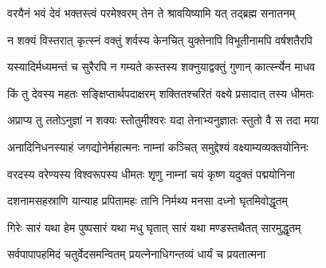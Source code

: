 \twolineshloka
{वरयैनं भवं देवं भक्तस्त्वं परमेश्वरम्}%
{तेन ते श्रावयिष्यामि यत् तद्‌ब्रह्म सनातनम्}%

\twolineshloka
{न शक्यं विस्तरात् कृत्स्नं वक्तुं शर्वस्य केनचित्}%
{युक्तेनापि विभूतीनामपि वर्षशतैरपि}%

\twolineshloka
{यस्यादिर्मध्यमन्तं च सुरैरपि न गम्यते}%
{कस्तस्य शक्नुयाद्वक्तुं गुणान् कार्त्स्न्येन माधव}%

\twolineshloka
{किं तु देवस्य महतः सङ्क्षिप्तार्थपदाक्षरम्}%
{शक्तितश्चरितं वक्ष्ये प्रसादात् तस्य धीमतः}%

\twolineshloka
{अप्राप्य तु ततोऽनुज्ञां न शक्यः स्तोतुमीश्वरः}%
{यदा तेनाभ्यनुज्ञातः स्तुतो वै स तदा मया}%

\twolineshloka
{अनादिनिधनस्याहं जगद्योनेर्महात्मनः}%
{नाम्नां कञ्चित् समुद्देश्यं वक्ष्याम्यव्यक्तयोनिनः}%

\twolineshloka
{वरदस्य वरेण्यस्य विश्वरूपस्य धीमतः}%
{शृणु नाम्नां चयं कृष्ण यदुक्तं पद्मयोनिना}%

\twolineshloka
{दशनामसहस्राणि यान्याह प्रपितामहः}%
{तानि निर्मथ्य मनसा दध्नो घृतमिवोद्धृतम्}%

\twolineshloka
{गिरेः सारं यथा हेम पुष्पसारं यथा मधु}%
{घृतात् सारं यथा मण्डस्तथैतत् सारमुद्धृतम्}%

\twolineshloka
{सर्वपापापहमिदं चतुर्वेदसमन्वितम्}%
{प्रयत्नेनाधिगन्तव्यं धार्यं च प्रयतात्मना}%


